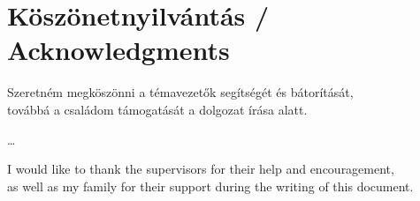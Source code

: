 \documentclass[12pt]{report}
\begin{document}
\chapter*{Köszönetnyilvántás / Acknowledgments}

\begin{center}
	Szeretném megköszönni a témavezetők segítségét és bátorítását,\\
	továbbá a családom támogatását a dolgozat írása alatt.
\end{center}
\begin{center}
	\dots
\end{center}
\begin{center}
	I would like to thank the supervisors for their help and encouragement,\\
	as well as my family for their support during the writing of this document.
\end{center}

 

\end{document}
